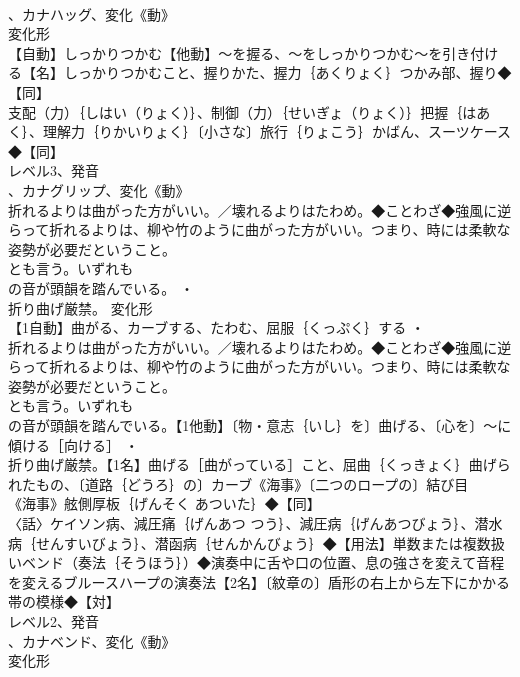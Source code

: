 \documentclass[8pt]{extreport}
\begin{document}
\begin{CJK}{UTF8}{min}
\\	、カナハッグ、変化《動》
\\	変化形 
\\	【自動】しっかりつかむ【他動】～を握る、～をしっかりつかむ～を引き付ける【名】しっかりつかむこと、握りかた、握力｛あくりょく｝つかみ部、握り◆【同】
\\	支配（力）｛しはい（りょく）｝、制御（力）｛せいぎょ（りょく）｝把握｛はあく｝、理解力｛りかいりょく｝〔小さな〕旅行｛りょこう｝かばん、スーツケース◆【同】
\\	レベル3、発音
\\	、カナグリップ、変化《動》
\\	折れるよりは曲がった方がいい。／壊れるよりはたわめ。◆ことわざ◆強風に逆らって折れるよりは、柳や竹のように曲がった方がいい。つまり、時には柔軟な姿勢が必要だということ。
\\	とも言う。いずれも
\\	の音が頭韻を踏んでいる。 ・
\\	折り曲げ厳禁。	変化形 
\\	【1自動】曲がる、カーブする、たわむ、屈服｛くっぷく｝する ・
\\	折れるよりは曲がった方がいい。／壊れるよりはたわめ。◆ことわざ◆強風に逆らって折れるよりは、柳や竹のように曲がった方がいい。つまり、時には柔軟な姿勢が必要だということ。
\\	とも言う。いずれも
\\	の音が頭韻を踏んでいる。【1他動】〔物・意志｛いし｝を〕曲げる、〔心を〕～に傾ける［向ける］ ・
\\	折り曲げ厳禁。【1名】曲げる［曲がっている］こと、屈曲｛くっきょく｝曲げられたもの、〔道路｛どうろ｝の〕カーブ《海事》〔二つのロープの〕結び目
\\	《海事》舷側厚板｛げんそく あついた｝◆【同】
\\	〈話〉ケイソン病、減圧痛｛げんあつ つう｝、減圧病｛げんあつびょう｝、潜水病｛せんすいびょう｝、潜函病｛せんかんびょう｝◆【用法】単数または複数扱いベンド（奏法｛そうほう｝）◆演奏中に舌や口の位置、息の強さを変えて音程を変えるブルースハープの演奏法【2名】〔紋章の〕盾形の右上から左下にかかる帯の模様◆【対】
\\	レベル2、発音
\\	、カナベンド、変化《動》
\\	変化形 

\end{CJK}
\end{document}
